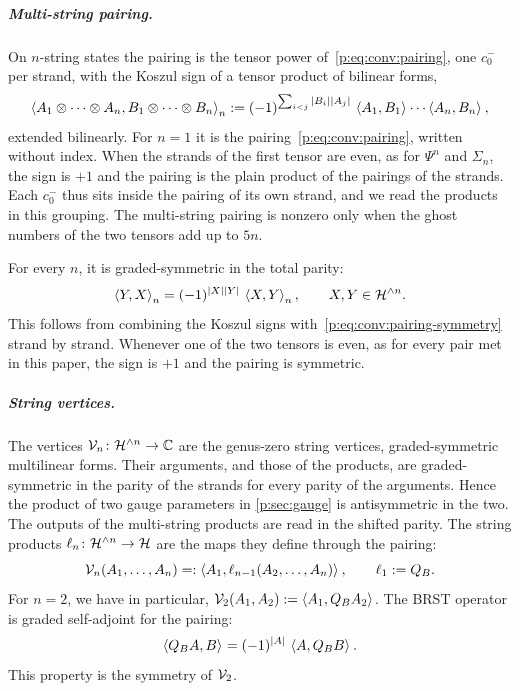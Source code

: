 \subparagraph{Multi-string pairing.}

On $n$-string states the pairing is the tensor power of~\eqref{p:eq:conv:pairing}, one $c_0^-$ per strand, with the Koszul sign of a tensor product of bilinear forms,
\begin{equation}
  \label{p:eq:conv:pairing-n}
  \pair[n]{A_1 \otimes \cdots \otimes A_n}{B_1 \otimes \cdots \otimes B_n}
    := (-1)^{\sum_{i < j} \abs{B_i} \abs{A_j}} \,
      \pair{A_1}{B_1} \cdots \pair{A_n}{B_n},
\end{equation}
extended bilinearly.
For $n = 1$ it is the pairing~\eqref{p:eq:conv:pairing}, written without index.
When the strands of the first tensor are even, as for $\Psi^n$ and $\Sigma_n$, the sign is $+1$ and the pairing is the plain product of the pairings of the strands.
Each $c_0^-$ thus sits inside the pairing of its own strand, and we read the products in this grouping.
The multi-string pairing is nonzero only when the ghost numbers of the two tensors add up to $5n$.

For every $n$, it is graded-symmetric in the total parity:
\begin{equation}
\label{p:eq:conv:pairing-n-symmetry}
\pair[n]{Y}{X}
  = (-1)^{\abs{X} \abs{Y}} \, \pair[n]{X}{Y},
\qquad
X, Y \in \Hn{n}.
\end{equation}
This follows from combining the Koszul signs with~\eqref{p:eq:conv:pairing-symmetry} strand by strand.
Whenever one of the two tensors is even, as for every pair met in this paper, the sign is $+1$ and the pairing is symmetric.


\subparagraph{String vertices.}

The vertices $\vertex{n} \colon \Hn{n} \to \C$ are the genus-zero string vertices, graded-symmetric multilinear forms.
Their arguments, and those of the products, are graded-symmetric in the parity of the strands for every parity of the arguments.
Hence the product of two gauge parameters in \cref{p:sec:gauge} is antisymmetric in the two.
The outputs of the multi-string products are read in the shifted parity.
The string products $\ell_n \colon \Hn{n} \to \Hs$ are the maps they define through the pairing:
\begin{equation}
  \label{p:eq:conv:vertex}
  \vertex{n}(A_1, \ldots, A_n)
    =: \pair{A_1}{\ell_{n-1}(A_2, \ldots, A_n)},
  \qquad
  \ell_1
    := Q_B.
\end{equation}
For $n = 2$, we have in particular, $\vertex{2}(A_1, A_2) := \pair{A_1}{Q_B A_2}$.
The BRST operator is graded self-adjoint for the pairing:
\begin{equation}
  \label{p:eq:conv:QB-self-adjoint}
  \pair{Q_B A}{B}
    = (-1)^{\abs{A}} \, \pair{A}{Q_B B}.
\end{equation}
This property is the symmetry of $\vertex{2}$.

